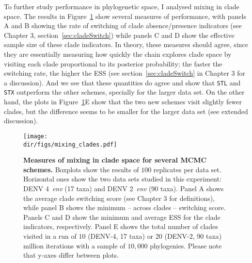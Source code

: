 To further study performance in phylogenetic space, I analysed mixing in clade space.
The results in Figure~\ref{fig:mixing_clades} show several measures of performance, with panels A and B showing the rate of switching of clade absence/presence indicators (see Chapter 3, section~\ref{sec:cladeSwitch}) while panels C and D show the effective sample size of these clade indicators.
In theory, these measures should agree, since they are essentially measuring how quickly the chain explores clade space by visiting each clade proportional to its posterior probability; the faster the switching rate, the higher the ESS (see section~\ref{sec:cladeSwitch} in Chapter 3 for a discussion).
And we see that these quantities do agree and show that \verb|STL| and \verb|STX|  outperform the other schemes, specially for the larger data set.
On the other hand, the plots in Figure~\ref{fig:mixing_clades}E show that the two new schemes visit slightly fewer clades, but the difference seems to be smaller for the larger data set (see extended discussion).

\begin{figure}[!ht]
\begin{center}
\texttt{[image: \\dir/figs/mixing\_clades.pdf]} 
\end{center}
 \caption[Measures of mixing in clade space for several MCMC schemes.]{\textbf{Measures of mixing in clade space for several MCMC schemes.}
  Boxplots show the results of $100$ replicates per data set.
  Horizontal ones show the two data sets studied in this experiment: DENV 4~\textit{env} (17 taxa) and DENV 2~\textit{env} (90 taxa).
  Panel A shows the average clade switching score (see Chapter 3 for definitions), while panel B shows the minimum -- across clades -- switching score.
  Panels C and D show the minimum and average ESS for the clade indicators, respectively.
  Panel E shows the total number of clades visited in a run of 10 (DENV-4, 17 taxa) or 20 (DENV-2, 90 taxa) million iterations with a sample of $10, 000$  phylogenies.
  Please note that y-axes differ between plots.
  }
 \label{fig:mixing_clades}
\end{figure}

